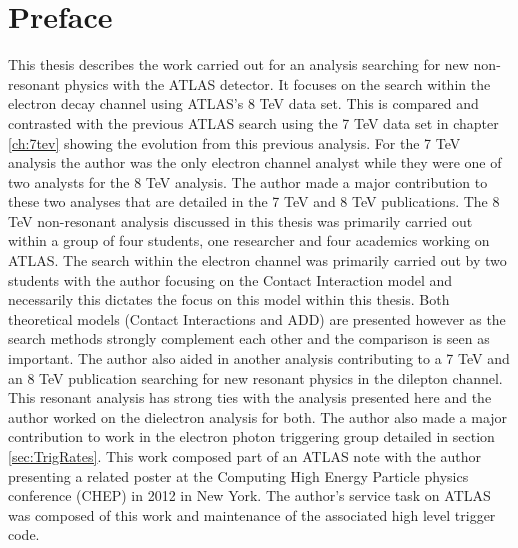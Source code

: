 \chapter*{Preface}
\pagestyle{headings}
\pagestyle{headings}

This thesis describes the work carried out for an analysis searching for new non-resonant physics with the ATLAS detector. It focuses on the search within the electron decay channel using ATLAS's 8 TeV data set. This is compared and contrasted with the previous ATLAS search using the 7 TeV data set in chapter \ref{ch:7tev} showing the evolution from this previous analysis. For the 7 TeV analysis the author was the only electron channel analyst while they were one of two analysts for the 8 TeV analysis. The author made a major contribution to these two analyses that are detailed in the 7 TeV \cite{PhysRevD.87.015010} and 8 TeV \cite{ATLAS-CONF-2014-030} publications.
The 8 TeV non-resonant analysis discussed in this thesis was primarily carried out within a group of four students, one researcher and four academics working on ATLAS. The search within the electron channel was primarily carried out by two students with the author focusing on the Contact Interaction model and necessarily this dictates the focus on this model within this thesis. Both theoretical models (Contact Interactions and ADD) are presented however as the search methods strongly complement each other and the comparison is seen as important.
The author also aided in another analysis contributing to a 7 TeV \cite{Aad:2012hf} and an 8 TeV \cite{Z:1515998} publication searching for new resonant physics in the dilepton channel. This resonant analysis has strong ties with the analysis presented here and the author worked on the dielectron analysis for both.
The author also made a major contribution to work in the electron photon triggering group detailed in section \ref{sec:TrigRates}. This work composed part of an ATLAS note \cite{ATL-PHYS-PUB-2011-007} with the author presenting a related poster \cite{Duguid:1450151} at the Computing High Energy Particle physics conference (CHEP) in 2012 in New York. 
The author's service task on ATLAS was composed of this work and maintenance of the associated high level trigger code.





